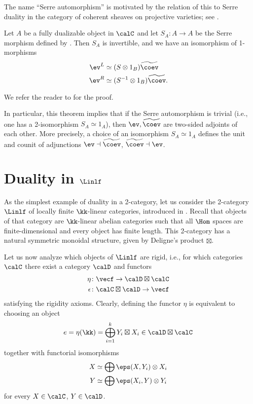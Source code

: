 \begin{remark}
  The name ``Serre automorphism'' is motivated by the relation of this to Serre
  duality in the category of coherent sheaves on projective varieties; see
  \cite[Remark 4.2.4]{lurie-cobordism}.
\end{remark}


\begin{theorem}\label{t:serre}
  Let $A$ be a fully dualizable object in $\calC$ and let
  $S_A\colon A\to A$ be the Serre morphism defined by .
   Then $S_A$ is invertible, and we have an isomorphism of 1-morphisms
   \begin{align*}
   \ev^L&\simeq (S\otimes 1_B)  \widetilde \coev \\
   \ev^R&\simeq (S^{-1}\otimes 1_B)\widetilde \coev.
   \end{align*}
\end{theorem}
We refer the reader to \cite[Section 3.1]{pstragowski} for the proof.

In particular, this theorem implies that if the Serre automorphism is trivial
(i.e., one has a 2-isomorphism $S_A\simeq 1_A$), then $\ev, \widetilde\coev$ are
two-sided adjoints of each other. More precisely, a choice of an isomorphism
$S_A\simeq 1_A$ defines the unit and counit of adjunctions $\ev\dashv
\widetilde\coev$, $\widetilde\coev\dashv\ev$.



\section{Duality in $\Linlf$}\label{s:lin-duals}
As the simplest example of duality in a 2-category, let us consider the
2-category $\Linlf$ of locally finite $\kk$-linear  categories, introduced in
. Recall that objects of that category are $\kk$-linear
abelian categories such that all $\Hom$ spaces are finite-dimensional and every
object has finite length. This 2-category has a natural symmetric monoidal
structure, given by Deligne's product $\boxtimes$.

Let us now analyze which objects of $\Linlf$ are rigid, i.e., for which
categories $\calC$ there exist a category $\calD$ and functors
\begin{align*}
  \eta&\colon \vecf \to \calD\boxtimes \calC\\
  \epsilon&\colon \calC\boxtimes \calD\to \vecf
\end{align*}
satisfying the rigidity axioms. Clearly, defining the functor $\eta$ is equivalent
to choosing an object
$$
  e=\eta (\kk)=\bigoplus_{i=1}^k Y_i\boxtimes X_i\in \calD\boxtimes \calC
$$
together with functorial isomorphisms
\begin{equation}\label{e:rigidity-lin}
  \begin{aligned}
    X&\simeq \bigoplus \eps(X,Y_i)\otimes X_i\\
    Y&\simeq \bigoplus \eps(X_i,Y)\otimes Y_i
  \end{aligned}
\end{equation}
for every $X\in \calC$, $Y\in \calD$.

